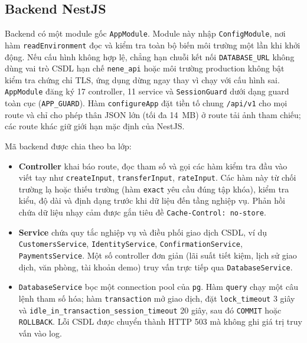 \subsection{Backend NestJS}
\label{sec:ch3-backend}

Backend có một module gốc \texttt{AppModule}. Module này nhập \texttt{ConfigModule}, nơi hàm \texttt{read\allowbreak{}Environment} đọc và kiểm tra toàn bộ biến môi trường một lần khi khởi động. Nếu cấu hình không hợp lệ, chẳng hạn chuỗi kết nối \texttt{DATABASE\_\allowbreak{}URL} không dùng vai trò CSDL hạn chế \texttt{nene\_\allowbreak{}api} hoặc môi trường production không bật kiểm tra chứng chỉ TLS, ứng dụng dừng ngay thay vì chạy với cấu hình sai. \texttt{AppModule} đăng ký 17 controller, 11 service và \texttt{SessionGuard} dưới dạng guard toàn cục (\texttt{APP\_\allowbreak{}GUARD}). Hàm \texttt{configureApp} đặt tiền tố chung \texttt{/\allowbreak{}api/\allowbreak{}v1} cho mọi route và chỉ cho phép thân JSON lớn (tối đa 14~MB) ở route tải ảnh tham chiếu; các route khác giữ giới hạn mặc định của NestJS.

Mã backend được chia theo ba lớp:
\begin{itemize}
	\item \textbf{Controller} khai báo route, đọc tham số và gọi các hàm kiểm tra đầu vào viết tay như \texttt{createInput}, \texttt{transferInput}, \texttt{rateInput}. Các hàm này từ chối trường lạ hoặc thiếu trường (hàm \texttt{exact} yêu cầu đúng tập khóa), kiểm tra kiểu, độ dài và định dạng trước khi dữ liệu đến tầng nghiệp vụ. Phản hồi chứa dữ liệu nhạy cảm được gắn tiêu đề \texttt{Cache-\allowbreak{}Control: no-\allowbreak{}store}.
	\item \textbf{Service} chứa quy tắc nghiệp vụ và điều phối giao dịch CSDL, ví dụ \texttt{Customers\allowbreak{}Service}, \texttt{Identity\allowbreak{}Service}, \texttt{Confirmation\allowbreak{}Service}, \texttt{Payments\allowbreak{}Service}. Một số controller đơn giản (lãi suất tiết kiệm, lịch sử giao dịch, văn phòng, tài khoản demo) truy vấn trực tiếp qua \texttt{Database\allowbreak{}Service}.
	\item \texttt{Database\allowbreak{}Service} bọc một connection pool của \texttt{pg}. Hàm \texttt{query} chạy một câu lệnh tham số hóa; hàm \texttt{transaction} mở giao dịch, đặt \texttt{lock\_\allowbreak{}timeout} 3 giây và \texttt{idle\_\allowbreak{}in\_\allowbreak{}transaction\_\allowbreak{}session\_\allowbreak{}timeout} 20 giây, sau đó \texttt{COMMIT} hoặc \texttt{ROLLBACK}. Lỗi CSDL được chuyển thành HTTP 503 mà không ghi giá trị truy vấn vào log.
\end{itemize}

